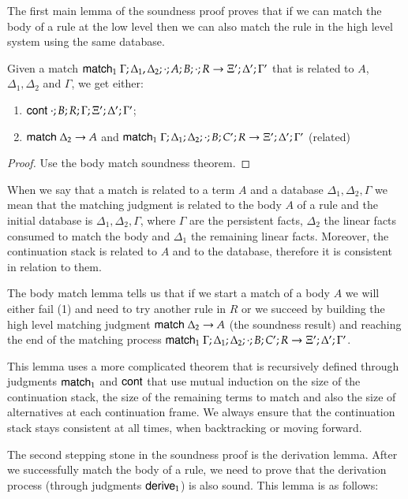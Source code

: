 The first main lemma of the soundness proof proves that if we can match the body
of a rule at the low level then we can also match the rule in the high level system using the same database.

\begin{lemma}
Given a match $\mathsf{match}_1 \; \Gamma; \Delta_1, \Delta_2; \cdot; A; B; \cdot; R \rightarrow \Xi'; \Delta'; \Gamma'$ that is related to $A$, $\Delta_1, \Delta_2$ and $\Gamma$, we get either:

\begin{enumerate}
   \item $\mathsf{cont} \; \cdot; B; R; \Gamma; \Xi'; \Delta'; \Gamma'$;
   \item $\mathsf{match} \; \Delta_2 \rightarrow A$ and $\mathsf{match}_1 \; \Gamma; \Delta_1; \Delta_2; \cdot; B; C'; R \rightarrow \Xi'; \Delta'; \Gamma'$ (related)
\end{enumerate}
\end{lemma}
\begin{proof}Use the body match soundness theorem.
\end{proof}

When we say that a match is related to a term $A$ and a database $\Delta_1, \Delta_2, \Gamma$ we mean that
the matching judgment is related to the body $A$ of a rule and the initial database is $\Delta_1, \Delta_2, \Gamma$, where $\Gamma$ are
the persistent facts, $\Delta_2$ the linear facts consumed to match the body and $\Delta_1$ the remaining linear facts.
Moreover, the continuation stack is related to $A$ and to the database, therefore it is consistent in relation to them.

The body match lemma tells us that if we start a match of a body $A$ we will either fail (1) and need to try another rule in $R$ or we succeed by building the high level matching judgment $\mathsf{match} \; \Delta_2 \rightarrow A$ (the soundness result) and reaching the end of the matching process $\mathsf{match}_1 \; \Gamma; \Delta_1; \Delta_2; \cdot; B; C'; R \rightarrow \Xi'; \Delta'; \Gamma'$.

This lemma uses a more complicated theorem that is recursively defined through judgments $\mathsf{match}_1$ and $\mathsf{cont}$ that use mutual induction on the
size of the continuation stack, the size of the remaining terms to match and also the size of alternatives at each continuation frame. We always ensure that the
continuation stack stays consistent at all times, when backtracking or moving forward.
 
The second stepping stone in the soundness proof is the derivation lemma. After we successfully match the
body of a rule, we need to prove that the derivation process (through judgments $\mathsf{derive}_1$) is also
sound. This lemma is as follows:

